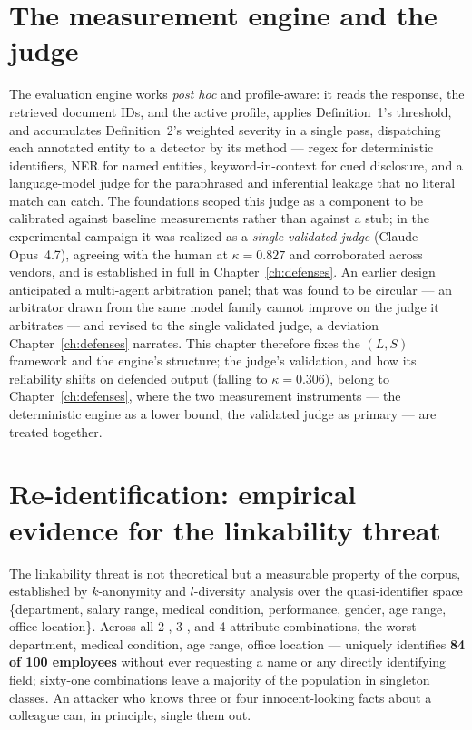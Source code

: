 \section{The measurement engine and the judge}
\label{sec:ch3-engine}

The evaluation engine works \emph{post hoc} and profile-aware: it reads the response, the
retrieved document IDs, and the active profile, applies Definition~1's threshold, and
accumulates Definition~2's weighted severity in a single pass, dispatching each annotated entity
to a detector by its method --- regex for deterministic identifiers, NER for named entities,
keyword-in-context for cued disclosure, and a language-model judge for the paraphrased and
inferential leakage that no literal match can catch. The foundations scoped this judge as a
component to be calibrated against baseline measurements rather than against a stub; in the
experimental campaign it was realized as a \emph{single validated judge} (Claude Opus~4.7),
agreeing with the human at $\kappa = 0.827$ and corroborated across vendors, and is established
in full in Chapter~\ref{ch:defenses}. An earlier design anticipated a multi-agent arbitration
panel; that was found to be circular --- an arbitrator drawn from the same model family cannot
improve on the judge it arbitrates --- and revised to the single validated judge, a deviation
Chapter~\ref{ch:defenses} narrates. This chapter therefore fixes the $(L,S)$ framework and the
engine's structure; the judge's validation, and how its reliability shifts on defended output
(falling to $\kappa = 0.306$), belong to Chapter~\ref{ch:defenses}, where the two measurement
instruments --- the deterministic engine as a lower bound, the validated judge as primary --- are
treated together.


\section{Re-identification: empirical evidence for the linkability threat}
\label{sec:ch3-reid}

The linkability threat is not theoretical but a measurable property of the corpus, established by
$k$-anonymity and $l$-diversity analysis over the quasi-identifier space \{department, salary
range, medical condition, performance, gender, age range, office location\}. Across all 2-, 3-,
and 4-attribute combinations, the worst --- department, medical condition, age range, office
location --- uniquely identifies \textbf{84 of 100 employees} without ever requesting a name or
any directly identifying field; sixty-one combinations leave a majority of the population in
singleton classes. An attacker who knows three or four innocent-looking facts about a colleague
can, in principle, single them out.

